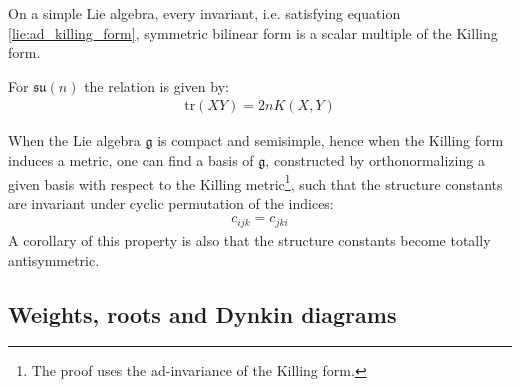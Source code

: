 	\begin{property}\label{lie:killing_trace}
		On a simple Lie algebra, every invariant, i.e. satisfying equation \ref{lie:ad_killing_form}, symmetric bilinear form is a scalar multiple of the Killing form.
	\end{property}
	\begin{example}
		For $\mathfrak{su}(n)$ the relation is given by:
		\begin{gather}
			\text{tr}(XY) = 2nK(X, Y)
		\end{gather}
	\end{example}
	
	\begin{property}
		When the Lie algebra $\mathfrak{g}$ is compact and semisimple, hence when the Killing form induces a metric, one can find a basis of $\mathfrak{g}$, constructed by orthonormalizing a given basis with respect to the Killing metric\footnote{The proof uses the ad-invariance of the Killing form.}, such that the structure constants are invariant under cyclic permutation of the indices:
		\begin{gather}
			c_{ijk} = c_{jki}
		\end{gather}
		A corollary of this property is also that the structure constants become totally antisymmetric.
	\end{property}

\subsection{Weights, roots and Dynkin diagrams}

	
